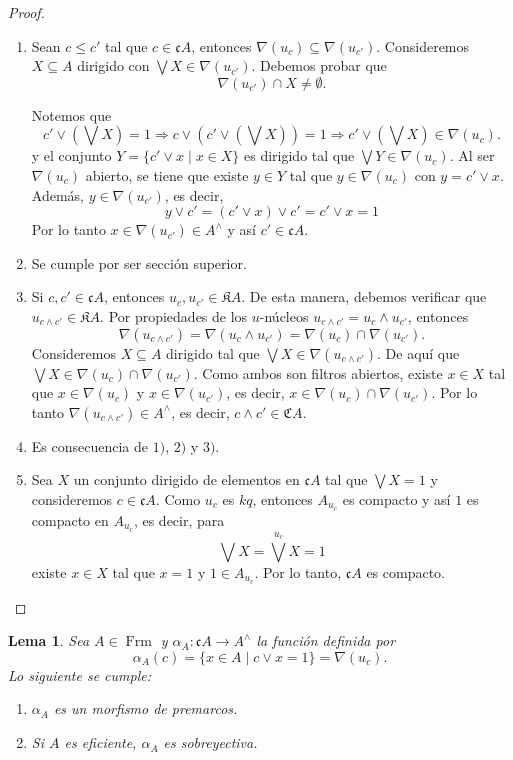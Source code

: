 \documentclass[11pt]{amsart}
\DeclareMathOperator{\Frm}{Frm}
\theoremstyle{plain}
\newtheorem{lem}[thm]{Lema}
\theoremstyle{definition}
\begin{document}
\begin{proof}
    \begin{enumerate}
        \item Sean $c\leq c'$ tal que $c\in \mathfrak{c}A$, entonces $\nabla(u_c)\subseteq \nabla(u_{c'})$. Consideremos $X\subseteq A$ dirigido con $\bigvee X\in \nabla(u_{c'})$. Debemos probar que 
        \[
        \nabla(u_{c'})\cap X\neq \emptyset.
        \]
        
        Notemos que 
        \[
        c'\vee (\bigvee X)=1\Rightarrow c\vee (c'\vee (\bigvee X))=1\Rightarrow c'\vee (\bigvee X)\in \nabla(u_c). 
        \]
        y el conjunto $Y=\{c'\vee x\mid x\in X\}$ es dirigido tal que $\bigvee Y\in \nabla(u_c)$. Al ser $\nabla(u_c)$ abierto, se tiene que existe $y\in Y$ tal que $y\in \nabla(u_c)$ con $y=c'\vee x$. Además, $y\in \nabla(u_{c'})$, es decir,
        \[
        y\vee c'=(c'\vee x)\vee c'= c'\vee x=1
        \]
        Por lo tanto $x\in \nabla(u_{c'})\in A^\wedge$ y así $c'\in \mathfrak{c}A$.
        \item Se cumple por ser sección superior.
        \item Si $c, c'\in \mathfrak{c}A$, entonces $u_c, u_{c'}\in \mathfrak{K}A$. De esta manera, debemos verificar que $u_{c\wedge c'}\in \mathfrak{K}A$. Por propiedades de los $u$-núcleos $u_{c\wedge c'}=u_c\wedge u_{c'}$, entonces
        \[
            \nabla(u_{c\wedge c'})=\nabla(u_c\wedge u_{c'})=\nabla(u_c)\cap \nabla(u_{c'}).
        \]
        Consideremos $X\subseteq A$ dirigido tal que $\bigvee X\in \nabla(u_{c\wedge c'})$. De aquí que $\bigvee X\in \nabla(u_c)\cap \nabla(u_{c'})$. Como ambos son filtros abiertos, existe $x\in X$ tal que $x\in \nabla(u_c)$ y $x\in \nabla(u_{c'})$, es decir, $x\in \nabla(u_c)\cap \nabla(u_{c'})$. Por lo tanto $\nabla(u_{c\wedge c'})\in A^\wedge$, es decir, $c\wedge c'\in \mathfrak{C}A$.
        \item Es consecuencia de $1)$, $2)$ y $3)$.
        \item Sea $X$ un conjunto dirigido de elementos en $\mathfrak{c}A$ tal que $\bigvee X=1$ y consideremos $c\in \mathfrak{c}A$. Como $u_c$ es $kq$, entonces $A_{u_c}$ es compacto y así $1$ es compacto en $A_{u_c}$, es decir, para
        \[
        \bigvee X=\bigvee^{u_c}X=1
        \]
        existe $x\in X$ tal que $x=1$ y $1\in A_{u_c}$.  Por lo tanto, $\mathfrak{c}A$ es compacto.
    \end{enumerate}
\end{proof}

\begin{lem}\label{Lema2.8y2.9}
    Sea $A\in \Frm$ y $\alpha_A\colon \mathfrak{c}A\to A^\wedge$ la función definida por
    \[
    \alpha_A(c)=\{x\in A\mid c\vee x=1\}=\nabla(u_c).
    \]
    Lo siguiente se cumple:
    \begin{enumerate}
        \item $\alpha_A$ es un morfismo de premarcos.
        \item Si $A$ es eficiente, $\alpha_A$ es sobreyectiva.
    \end{enumerate}
\end{lem}
\end{document}
